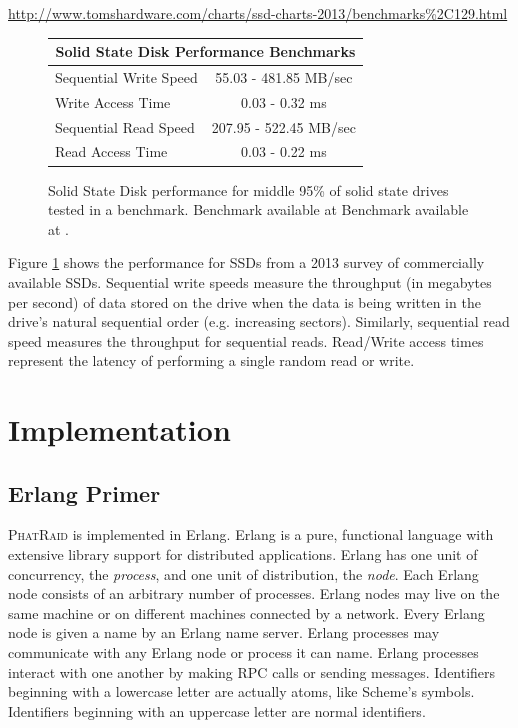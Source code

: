 \documentclass[10pt,letter]{article}
\newcommand{\phatraid}[0]{\textsc{PhatRaid}}
\begin{document}
\urldef\hwbenchmark\url{http://www.tomshardware.com/charts/ssd-charts-2013/benchmarks%2C129.html}
\begin{figure}
\centering
\begin{tabular}{l || c}
\multicolumn{2}{c}{{\bf Solid State Disk Performance Benchmarks}} \\ \hline
Sequential Write Speed  \hspace{7em} & 55.03 - 481.85 MB/sec \\ 
Write Access Time & 0.03 - 0.32 ms \\ \hline
Sequential Read Speed &  207.95 - 522.45 MB/sec \\
Read Access Time & 0.03 - 0.22 ms \\ \hline
\end{tabular}
\caption[Solid State Performance]{Solid State Disk performance for middle 95\% of solid state drives tested in a benchmark. Benchmark available at Benchmark available at \hwbenchmark.}
\label{fig:sdd-perf}
\end{figure}

Figure \ref{fig:sdd-perf} shows the performance for SSDs from a 2013 survey of commercially available SSDs. Sequential write speeds measure the throughput (in megabytes per second) of data stored on the drive when the data is being written in the drive's natural sequential order (e.g. increasing sectors). Similarly, sequential read speed measures the throughput for sequential reads. Read/Write access times represent the latency of performing a single random read or write. 

\section{Implementation}

\subsection{Erlang Primer}

\phatraid{} is implemented in Erlang. Erlang is a pure, functional language with
extensive library support for distributed applications. Erlang has one unit of
concurrency, the \emph{process}, and one unit of distribution, the
\emph{node}. Each Erlang node consists of an arbitrary number of
processes. Erlang nodes may live on the same machine or on different machines
connected by a network. Every Erlang node is given a name by an Erlang name
server. Erlang processes may communicate with any Erlang node or process it can
name. Erlang processes interact with one another by making RPC calls or sending
messages. Identifiers beginning with a lowercase letter are actually atoms, like
Scheme's symbols. Identifiers beginning with an uppercase letter are normal
identifiers.
\end{document}
